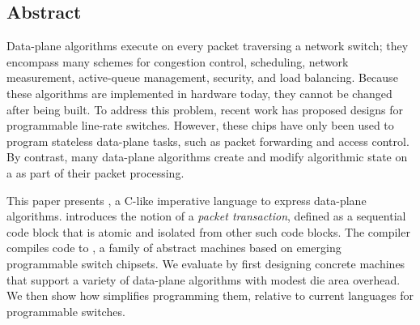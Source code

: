 \subsection*{Abstract}
Data-plane algorithms execute on every packet traversing a network switch; they
encompass many schemes for congestion control, scheduling, network measurement,
active-queue management, security, and load balancing. Because these algorithms
are implemented in hardware today, they cannot be changed after being built. To
address this problem, recent work has proposed designs for programmable
line-rate switches.  However, these chips have only been used to program
stateless data-plane tasks, such as packet forwarding and access control. By
contrast, many data-plane algorithms create and modify algorithmic state on a
as part of their packet processing.

This paper presents \pktlanguage, a C-like imperative language to express
data-plane algorithms. \pktlanguage introduces the notion of a {\em packet
transaction}, defined as a sequential code block that is atomic and isolated
from other such code blocks.  The \pktlanguage compiler compiles \pktlanguage
code to \absmachine, a family of abstract machines based on emerging
programmable switch chipsets. We evaluate \pktlanguage by first designing
concrete \absmachine machines that support a variety of data-plane algorithms
with modest die area overhead. We then show how \pktlanguage simplifies
programming them, relative to current languages for programmable switches.
